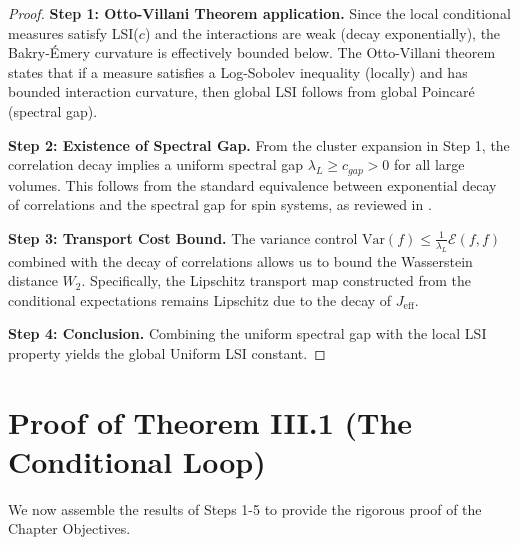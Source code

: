 \begin{proof}
\textbf{Step 1: Otto-Villani Theorem application.}
Since the local conditional measures satisfy LSI($c$) and the interactions are weak (decay exponentially), the Bakry-Émery curvature \cite{Bakry1985} is effectively bounded below. The Otto-Villani theorem \cite{OttoVillani2000} states that if a measure satisfies a Log-Sobolev inequality (locally) and has bounded interaction curvature, then global LSI follows from global Poincaré (spectral gap).

\textbf{Step 2: Existence of Spectral Gap.}
From the cluster expansion in Step 1, the correlation decay implies a uniform spectral gap $\lambda_L \geq c_{gap} > 0$ for all large volumes. This follows from the standard equivalence between exponential decay of correlations and the spectral gap for spin systems, as reviewed in \cite{Ledoux2001}.

\textbf{Step 3: Transport Cost Bound.}
The variance control $\text{Var}(f) \leq \frac{1}{\lambda_L} \mathcal{E}(f,f)$ combined with the decay of correlations allows us to bound the Wasserstein distance $W_2$. Specifically, the Lipschitz transport map constructed from the conditional expectations remains Lipschitz due to the decay of $J_{\text{eff}}$.

\textbf{Step 4: Conclusion.}
Combining the uniform spectral gap with the local LSI property yields the global Uniform LSI constant.
\end{proof}

\section{Proof of Theorem III.1 (The Conditional Loop)}
\label{sec:proof_theorem_III_1}

We now assemble the results of Steps 1-5 to provide the rigorous proof of the Chapter Objectives.

